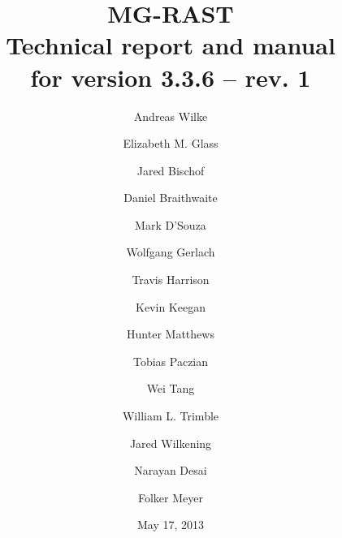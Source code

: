 \documentclass[12pt,fullpage]{report}
\begin{document}
\author[1,2]{Andreas Wilke}
\author[1,2]{Elizabeth M. Glass}
\author[2,1]{Jared Bischof}
\author[1,2]{Daniel Braithwaite}
\author[2,1]{Mark D'Souza}
\author[2,1]{Wolfgang Gerlach}
\author[2,1]{Travis Harrison}
\author[1,2]{Kevin Keegan}
\author[1,2]{Hunter Matthews}
\author[2,1]{Tobias Paczian}
\author[1,2]{Wei Tang}
\author[2.1]{William L. Trimble}
\author[1,2]{Jared Wilkening}
\author[1,2]{Narayan Desai}
\author[1,2]{Folker Meyer}
\date{May 17, 2013}
\title{
MG-RAST \\
Technical report and manual\\
for version 3.3.6 -- rev. 1
}
\maketitle

\tableofcontents

\newpage


\end{document}
